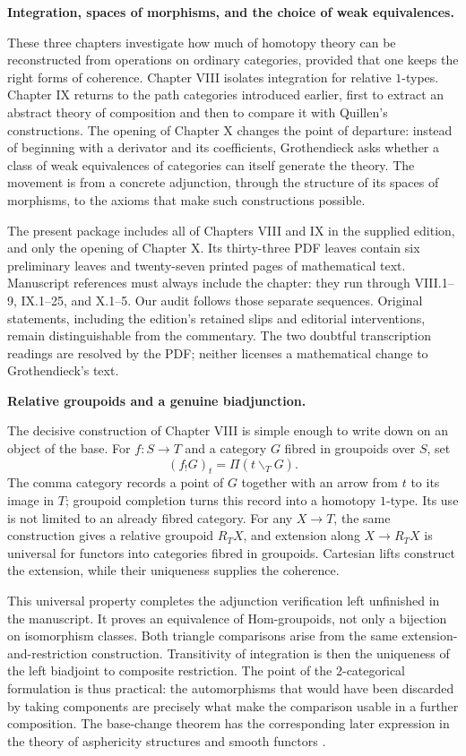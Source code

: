 \noindent\textbf{Integration, spaces of morphisms, and the choice of weak equivalences.}

These three chapters investigate how much of homotopy theory can be reconstructed from operations on ordinary categories, provided that one keeps the right forms of coherence. Chapter VIII isolates integration for relative $1$-types. Chapter IX returns to the path categories introduced earlier, first to extract an abstract theory of composition and then to compare it with Quillen's constructions. The opening of Chapter X changes the point of departure: instead of beginning with a derivator and its coefficients, Grothendieck asks whether a class of weak equivalences of categories can itself generate the theory. The movement is from a concrete adjunction, through the structure of its spaces of morphisms, to the axioms that make such constructions possible.

The present package includes all of Chapters VIII and IX in the supplied edition, and only the opening of Chapter X. Its thirty-three PDF leaves contain six preliminary leaves and twenty-seven printed pages of mathematical text. Manuscript references must always include the chapter: they run through VIII.1--9, IX.1--25, and X.1--5. Our audit follows those separate sequences. Original statements, including the edition's retained slips and editorial interventions, remain distinguishable from the commentary. The two doubtful transcription readings are resolved by the PDF; neither licenses a mathematical change to Grothendieck's text.

\medskip\noindent\textbf{Relative groupoids and a genuine biadjunction.}

The decisive construction of Chapter VIII is simple enough to write down on an object of the base. For $f:S\to T$ and a category $G$ fibred in groupoids over $S$, set
\[
 (f_!G)_t=\Pi(t\backslash_TG).
\]
The comma category records a point of $G$ together with an arrow from $t$ to its image in $T$; groupoid completion turns this record into a homotopy $1$-type. Its use is not limited to an already fibred category. For any $X\to T$, the same construction gives a relative groupoid $R_TX$, and extension along $X\to R_TX$ is universal for functors into categories fibred in groupoids. Cartesian lifts construct the extension, while their uniqueness supplies the coherence.

This universal property completes the adjunction verification left unfinished in the manuscript. It proves an equivalence of Hom-groupoids, not only a bijection on isomorphism classes. Both triangle comparisons arise from the same extension-and-restriction construction. Transitivity of integration is then the uniqueness of the left biadjoint to composite restriction. The point of the $2$-categorical formulation is thus practical: the automorphisms that would have been discarded by taking components are precisely what make the comparison usable in a further composition. The base-change theorem has the corresponding later expression in the theory of asphericity structures and smooth functors \citep[\S5]{Maltsiniotis2005Asphericite}.

